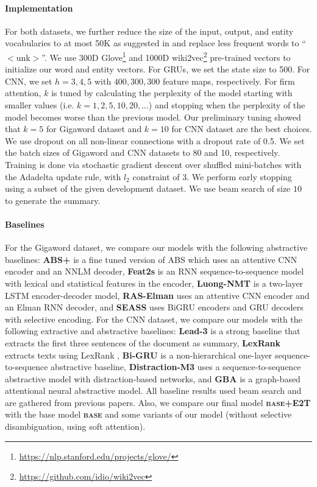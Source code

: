\documentclass[11pt,a4paper]{article}
\begin{document}
\paragraph{Implementation}

For both datasets, we further reduce the size of the input, output, and entity vocabularies to at most 50K as suggested in \cite{see2017get} and replace less frequent words to ``$<$unk$>$''. We use 300D Glove\footnote{\url{https://nlp.stanford.edu/projects/glove/}} \cite{pennington2014glove} and 1000D wiki2vec\footnote{\url{https://github.com/idio/wiki2vec}} pre-trained vectors to initialize our word and entity vectors. For GRUs, we set the state size to 500. For CNN, we set $h=3, 4, 5$ with $400, 300, 300$ feature maps, respectively. For firm attention, $k$ is tuned
by calculating the perplexity of the model starting with smaller values (i.e. $k=1,2,5,10,20,...$) and stopping when the perplexity of the model becomes worse than the previous model.
Our preliminary tuning showed that $k=5$ for Gigaword dataset and $k=10$ for CNN dataset are the best choices.
We use dropout \cite{srivastava2014dropout} on all non-linear connections with a dropout rate of 0.5. 
We set the batch sizes of Gigaword and CNN datasets to 80 and 10, respectively.
Training is done via stochastic gradient descent over shuffled mini-batches with the Adadelta update rule, with $l_2$ constraint \cite{hinton2012improving} of 3. We perform early stopping using a subset of the given development dataset. We use beam search of size $10$ to generate the summary.

\paragraph{Baselines}

For the Gigaword dataset, we compare our models with the following abstractive baselines: \textbf{ABS+} \cite{rush2015neural} is a fine tuned version of ABS which uses an attentive CNN encoder and an NNLM decoder, \textbf{Feat2s} \cite{nallapati2016abstractive} is an RNN sequence-to-sequence model with lexical and statistical features in the encoder, \textbf{Luong-NMT} \cite{luong2015effective} is a two-layer LSTM encoder-decoder model, \textbf{RAS-Elman} \cite{chopra2016abstractive} uses an attentive CNN encoder and an Elman RNN decoder, and \textbf{SEASS} \cite{zhou2017selective} uses BiGRU encoders and GRU decoders with selective encoding.
For the CNN dataset, we compare our models with the following extractive and abstractive baselines:
\textbf{Lead-3} is a strong baseline that extracts the first three sentences of the document as summary, \textbf{LexRank} extracts texts using LexRank \cite{erkan2004lexrank}, \textbf{Bi-GRU} is a non-hierarchical one-layer sequence-to-sequence abstractive baseline, \textbf{Distraction-M3} \cite{chen2016distraction} uses a sequence-to-sequence abstractive model with distraction-based networks, and \textbf{GBA} \cite{tan2017abstractive} is a graph-based attentional neural abstractive model.
All baseline results used beam search and are gathered from previous papers. Also, we compare our final model \textbf{\textsc{base}+E2T} with the base model \textbf{\textsc{base}} and some variants of our model (without selective disambiguation, using soft attention).
\end{document}
